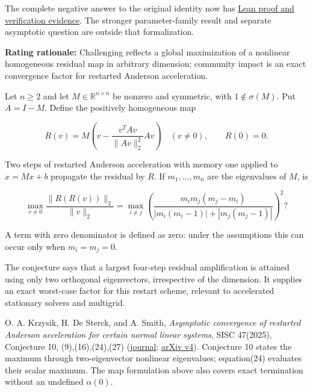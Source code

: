 \documentclass[11pt,a4paper]{article}
\makeatletter
\renewcommand{\subsection}{\Needspace{4\baselineskip}\@startsection{subsection}{2}{0pt}{9pt plus 1pt minus 1pt}{3pt}{\sffamily\bfseries\normalsize\color{ink}}}
\makeatother
\begin{document}
The complete negative answer to the original identity now has
\href{https://github.com/ajt60gaibb/OpenProblemsInNLA/blob/main/linear-systems-and-elimination/IE-18\#lean-proof-and-verification-evidence--2026-09-12}{Lean
proof and verification evidence}. The stronger parameter-family result
and separate asymptotic question are outside that formalization.

\textbf{Rating rationale:} Challenging reflects a global maximization of
a nonlinear homogeneous residual map in arbitrary dimension; community
impact is an exact convergence factor for restarted Anderson
acceleration.

Let \(n\ge2\) and let \(M\in\mathbb R^{n\times n}\) be nonzero and
symmetric, with \(1\notin\sigma(M)\). Put \(A=I-M\). Define the
positively homogeneous map

\[R(v)=M\left(v-\frac{v^TAv}{\|Av\|_2^2}Av\right)\quad(v\ne0),\qquad R(0)=0.\]

Two steps of restarted Anderson acceleration with memory one applied to
\(x=Mx+b\) propagate the residual by \(R\). If \(m_1,\ldots,m_n\) are
the eigenvalues of \(M\), is

\[\max_{v\ne0}\frac{\|R(R(v))\|_2}{\|v\|_2}
=
\max_{i\ne j}
\left(\frac{m_im_j(m_j-m_i)}{|m_i(m_i-1)|+|m_j(m_j-1)|}\right)^2?\]

A term with zero denominator is defined as zero: under the assumptions
this can occur only when \(m_i=m_j=0\).

The conjecture says that a largest four-step residual amplification is
attained using only two orthogonal eigenvectors, irrespective of the
dimension. It supplies an exact worst-case factor for this restart
scheme, relevant to accelerated stationary solvers and multigrid.

\newpage
\subsection{References}\label{references}

O. A. Krzysik, H. De Sterck, and A. Smith, \emph{Asymptotic convergence
of restarted Anderson acceleration for certain normal linear systems},
SISC 47(2025), Conjecture 10, (9),(16),(24),(27)
(\href{https://doi.org/10.1137/24M1672262}{journal};
\href{https://arxiv.org/html/2312.04776v4}{arXiv v4}). Conjecture 10
states the maximum through two-eigenvector nonlinear eigenvalues;
equation(24) evaluates their scalar maximum. The map formulation above
also covers exact termination without an undefined \(\alpha(0)\).
\end{document}
